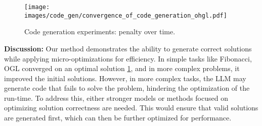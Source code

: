\begin{figure}[t]
    \centering
    \texttt{[image: images/code\_gen/convergence\_of\_code\_generation\_ohgl.pdf]}
    \caption{Code generation experiments: penalty over time.}
    \label{fig:code_opt_convergence}
\end{figure}

\textbf{Discussion:} Our method demonstrates the ability to generate correct solutions while applying micro-optimizations for efficiency. In simple tasks like Fibonacci, OGL converged on an optimal solution \ref{fig:code_opt_convergence}, and in more complex problems, it improved the initial solutions. However, in more complex tasks, the LLM may generate code that fails to solve the problem, hindering the optimization of the run-time. To address this, either stronger models or methods focused on optimizing solution correctness are needed. This would ensure that valid solutions are generated first, which can then be further optimized for performance.